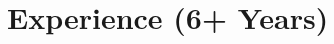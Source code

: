 \documentclass{subfiles}
\begin{document}
\section{Experience (6+ Years)}



% 


% 



\end{document}
